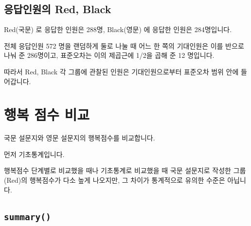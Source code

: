 \documentclass[
]{book}
\begin{document}
\subsection{응답인원의 Red, Black}\label{uxc751uxb2f5uxc778uxc6d0uxc758-red-black-10}

Red(국문) 로 응답한 인원은 288명, Black(영문) 에 응답한 인원은 284명입니다.

전체 응답인원 572 명을 랜덤하게 둘로 나눌 때 어느 한 쪽의 기대인원은 이를 반으로 나눠 준 286명이고, 표준오차는 이의 제곱근에 1/2을 곱해 준 12 명입니다.

따라서 Red, Black 각 그룹에 관찰된 인원은 기대인원으로부터 표준오차 범위 안에 들어갑니다.

\section{행복 점수 비교}\label{uxd589uxbcf5-uxc810uxc218-uxbe44uxad50-1}

국문 설문지와 영문 설문지의 행복점수를 비교합니다.

먼저 기초통계입니다.

행복점수 단계별로 비교했을 때나 기초통계로 비교했을 때 국문 설문지로 작성한 그룹 (Red)의 행복점수가 다소 높게 나오지만, 그 차이가 통계적으로 유의한 수준은 아닙니다.

\subsection{\texorpdfstring{\texttt{summary()}}{summary()}}\label{summary-3}
\end{document}
